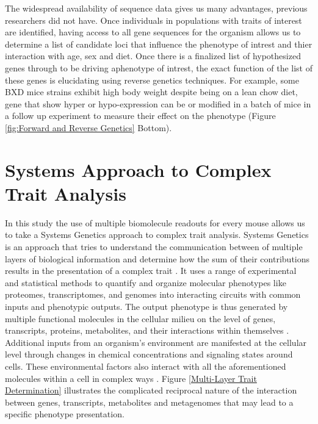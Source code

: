 \documentclass[a4paper,11pt,twoside]{book}
\begin{document}
	 The widespread availability of sequence data gives us many advantages, previous researchers did not have. Once individuals in populations with traits of interest are identified, having access to all gene sequences for the organism allows us to determine a list of candidate loci that influence the phenotype of intrest and thier interaction with age, sex and diet. Once there is a finalized list of hypothesized genes through to be driving aphenotype of intrest, the exact function of the list of these genes is elucidating using reverse genetics techniques\citep{MelindaB.TierneyandKurtH.Lamour2005}. For example, some BXD mice strains exhibit high body weight despite being on a lean chow diet, gene that show hyper or hypo-expression can be or modified in a batch of mice in a follow up experiment to measure their effect on the phenotype (Figure \ref{fig:Forward and Reverse Genetics} Bottom).

	
	\section{Systems Approach to Complex Trait Analysis}
	
    In this study the use of multiple biomolecule readouts for every mouse allows us to take a Systems Genetics approach to complex trait analysis. Systems Genetics is an approach that tries to understand the communication between of multiple layers of biological information and determine how the sum of their contributions results in the presentation of a complex trait \citep{Civelek2014SystemsTraits}. It uses a range of experimental and statistical methods to quantify and organize molecular phenotypes like proteomes, transcriptomes, and genomes into interacting circuits with common inputs and phenotypic outputs. The output phenotype is thus generated by multiple functional molecules in the cellular milieu on the level of genes, transcripts, proteins, metabolites, and their interactions within themselves \citep{Civelek2014SystemsTraits}. Additional inputs from an organism's environment are manifested at the cellular level through changes in chemical concentrations and signaling states around cells. These environmental factors also interact with all the aforementioned molecules within a cell in complex ways \citep{Civelek2014SystemsTraits}. Figure \ref{Multi-Layer Trait Determination} illustrates the complicated reciprocal nature of the interaction between genes, transcripts, metabolites and metagenomes that may lead to a specific phenotype presentation. 
	
\end{document}
